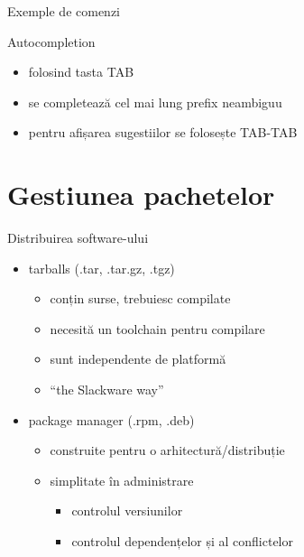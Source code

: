 \documentclass{curs}
\begin{document}
\begin{frame}{Exemple de comenzi}
  
\end{frame}

\begin{frame}{Autocompletion}
  \begin{itemize}
    \item folosind tasta TAB
    \item se completează cel mai lung prefix neambiguu
    \item pentru afișarea sugestiilor se folosește TAB-TAB
  \end{itemize}
\end{frame}

\section{Gestiunea pachetelor}

\begin{frame}{Distribuirea software-ului}
  \begin{itemize}
    \item tarballs (.tar, .tar.gz, .tgz)
    \begin{itemize}
      \item conțin surse, trebuiesc compilate
      \item necesită un toolchain pentru compilare
      \item sunt independente de platformă
      \item ``the Slackware way''
    \end{itemize}
    \pause
    \item package manager (.rpm, .deb)
    \begin{itemize}
      \item construite pentru o arhitectură/distribuție
      \item simplitate în administrare
      \begin{itemize}
        \item controlul versiunilor
        \item controlul dependențelor și al conflictelor
      \end{itemize}
    \end{itemize}
  \end{itemize}
\end{frame}
\end{document}
